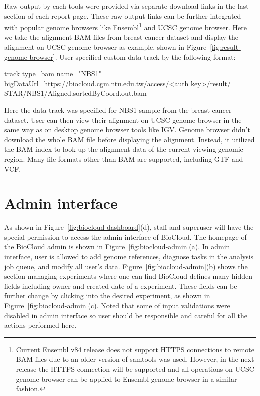 

Raw output by each tools were provided via separate download links in the last
section of each report page. These raw output links can be further integrated
with popular genome browsers like Ensembl\footnote{
    Current Ensembl v84 release does not support HTTPS connections to remote
    BAM files due to an older version of samtools was used. However, in the
    next release the HTTPS connection will be supported and all operations on
    UCSC genome browser can be applied to Ensembl genome browser in a similar
    fashion.
} and UCSC genome browser. Here we take the alignment BAM files from breast cancer
dataset and display the alignment on UCSC genome browser as example, shown in
Figure~\ref{fig:result-genome-browser}. User specified custom data track by the
following format:

\begin{CVerbatim}[fontsize=\small]
track type=bam name="NBS1"
bigDataUrl=https://biocloud.cgm.ntu.edu.tw/access/<auth key>/result/
STAR/NBS1/Aligned.sortedByCoord.out.bam
\end{CVerbatim}

\vspace{-1em}\noindent
Here the data track was specified for NBS1 sample from the breast cancer
dataset. User can then view their alignment on UCSC genome browser in the same
way as on desktop genome browser tools like IGV. Genome browser didn't download
the whole BAM file before displaying the alignment. Instead, it utilized the
BAM index to look up the alignment data of the current viewing genomic region.
Many file formats other than BAM are supported, including GTF and VCF.



\section{Admin interface}
\label{s:biocloud-admin}



As shown in Figure~\ref{fig:biocloud-dashboard}(d), staff and superuser will
have the special permission to access the admin interface of BioCloud. The
homepage of the BioCloud admin is shown in Figure~\ref{fig:biocloud-admin}(a).
In admin interface, user is allowed to add genome references, diagnose tasks in
the analysis job queue, and modify all user's data.
Figure~\ref{fig:biocloud-admin}(b) shows the section managing experiments where
one can find BioCloud defines many hidden fields including owner and created
date of a experiment. These fields can be further change by clicking into the
desired experiment, as shown in Figure~\ref{fig:biocloud-admin}(c). Noted that
some of input validations were disabled in admin interface so user should be
responsible and careful for all the actions performed here.

